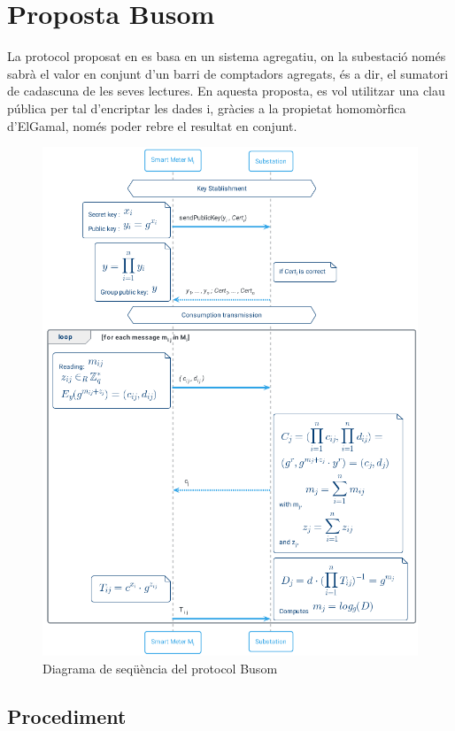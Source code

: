 \documentclass{article}
\begin{document}
\section{Proposta Busom}
La protocol proposat en \cite{busom} es basa en un sistema agregatiu, on la subestació només sabrà el valor en conjunt d'un barri de comptadors agregats, és a dir, el sumatori de cadascuna de les seves lectures. En aquesta proposta, es vol utilitzar una clau pública per tal d'encriptar les dades i, gràcies a la propietat homomòrfica d'ElGamal, només poder rebre el resultat en conjunt.
\begin{figure}[H]
	\centering
	\includegraphics[width=14cm]{umls/busom.png}
	\caption{Diagrama de seqüència del protocol Busom}
\end{figure}

\subsection{Procediment}
\end{document}

